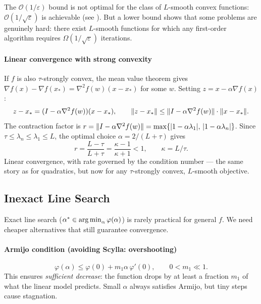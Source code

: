 The $\mathcal{O}(1/\varepsilon)$ bound is not optimal for the class of $L$-smooth convex functions: $\mathcal{O}(1/\sqrt{\varepsilon})$ is achievable (see ).
But a lower bound shows that some problems are genuinely hard: there exist $L$-smooth functions for which any first-order algorithm requires $\Omega(1/\sqrt{\varepsilon})$ iterations.

\paragraph{Linear convergence with strong convexity}

If $f$ is also $\tau$-strongly convex, the mean value theorem gives $\nabla f(x) - \nabla f(x_*) = \nabla^2 f(w)(x - x_*)$ for some $w$.
Setting $z = x - \alpha \nabla f(x)$:
\begin{equation}\label{eq:strong-convex-contraction}
	z - x_* = (I - \alpha \nabla^2 f(w))(x - x_*),
	\qquad
	\lVert z - x_*\rVert \leq \lVert I - \alpha \nabla^2 f(w)\rVert \cdot \lVert x - x_*\rVert.
\end{equation}
The contraction factor is $r = \lVert I - \alpha \nabla^2 f(w)\rVert = \max\{|1 - \alpha\lambda_1|,\, |1 - \alpha\lambda_n|\}$.
Since $\tau \leq \lambda_n \leq \lambda_1 \leq L$, the optimal choice $\alpha = 2/(L + \tau)$ gives
\begin{equation}\label{eq:optimal-fixed-rate}
	r = \frac{L - \tau}{L + \tau} = \frac{\kappa - 1}{\kappa + 1} < 1,
	\qquad \kappa = L / \tau.
\end{equation}
Linear convergence, with rate governed by the condition number --- the same story as for quadratics, but now for any $\tau$-strongly convex, $L$-smooth objective.


\subsection{Inexact Line Search}\label{ssec:line-search}

Exact line search ($\alpha^* \in \operatorname*{arg\,min}_\alpha \varphi(\alpha)$) is rarely practical for general $f$.
We need cheaper alternatives that still guarantee convergence.

\paragraph{Armijo condition (avoiding Scylla: overshooting)}

\begin{equation}\label{eq:armijo}
	\varphi(\alpha) \leq \varphi(0) + m_1 \alpha\, \varphi'(0),
	\qquad 0 < m_1 \ll 1.
\end{equation}
This ensures \textit{sufficient decrease}: the function drops by at least a fraction $m_1$ of what the linear model predicts.
Small $\alpha$ always satisfies Armijo, but tiny steps cause stagnation.

